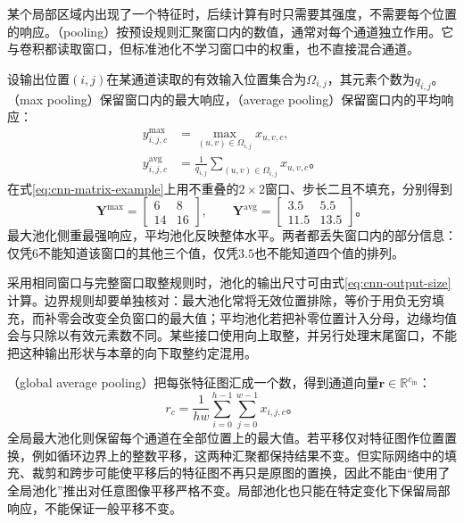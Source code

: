 某个局部区域内出现了一个特征时，后续计算有时只需要其强度，不需要每个位置的响应。（pooling）按预设规则汇聚窗口内的数值，通常对每个通道独立作用。它与卷积都读取窗口，但标准池化不学习窗口中的权重，也不直接混合通道。

设输出位置$(i,j)$在某通道读取的有效输入位置集合为$\Omega_{i,j}$，其元素个数为$q_{i,j}$。（max pooling）保留窗口内的最大响应，（average pooling）保留窗口内的平均响应：
\begin{equation}
  \begin{aligned}
    y_{i,j,c}^{\mathrm{max}}&=\max_{(u,v)\in\Omega_{i,j}}x_{u,v,c},\\
    y_{i,j,c}^{\mathrm{avg}}&=\frac1{q_{i,j}}
                   \sum_{(u,v)\in\Omega_{i,j}}x_{u,v,c}\text{。}
  \end{aligned}
  \label{eq:cnn-local-pooling}
\end{equation}
在式\eqref{eq:cnn-matrix-example}上用不重叠的$2\times2$窗口、步长二且不填充，分别得到
\begin{equation}
  \bm Y^{\mathrm{max}}=\begin{bmatrix}6&8\\14&16\end{bmatrix},\qquad
  \bm Y^{\mathrm{avg}}=\begin{bmatrix}3.5&5.5\\11.5&13.5\end{bmatrix}\text{。}
  \label{eq:cnn-pooling-example}
\end{equation}
最大池化侧重最强响应，平均池化反映整体水平。两者都丢失窗口内的部分信息：仅凭$6$不能知道该窗口的其他三个值，仅凭$3.5$也不能知道四个值的排列。

采用相同窗口与完整窗口取整规则时，池化的输出尺寸可由式\eqref{eq:cnn-output-size}计算。边界规则却要单独核对：最大池化常将无效位置排除，等价于用负无穷填充，而补零会改变全负窗口的最大值；平均池化若把补零位置计入分母，边缘均值会与只除以有效元素数不同。某些接口使用向上取整，并另行处理末尾窗口，不能把这种输出形状与本章的向下取整约定混用。

（global average pooling）把每张特征图汇成一个数，得到通道向量$\bm r\in\mathbb R^{c_{\mathrm{in}}}$：
\begin{equation}
  r_c=\frac1{hw}\sum_{i=0}^{h-1}\sum_{j=0}^{w-1}x_{i,j,c}\text{。}
  \label{eq:cnn-global-average-pooling}
\end{equation}
全局最大池化则保留每个通道在全部位置上的最大值。若平移仅对特征图作位置置换，例如循环边界上的整数平移，这两种汇聚都保持结果不变。但实际网络中的填充、裁剪和跨步可能使平移后的特征图不再只是原图的置换，因此不能由“使用了全局池化”推出对任意图像平移严格不变。局部池化也只能在特定变化下保留局部响应，不能保证一般平移不变。

